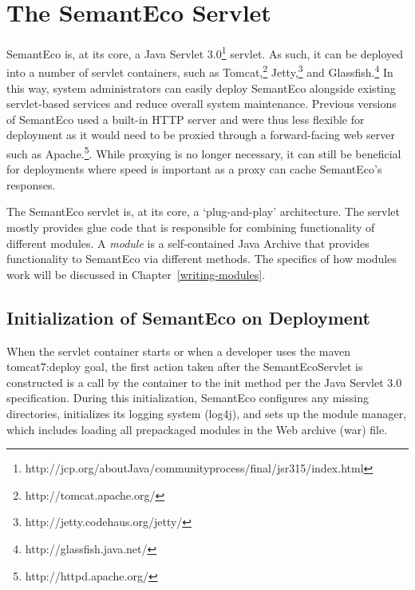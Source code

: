 \documentclass[letterpaper]{report}
\begin{document}
\section{The SemantEco Servlet}
\label{servlet}
SemantEco is, at its core, a Java Servlet 3.0\footnote{http://jcp.org/aboutJava/communityprocess/final/jsr315/index.html} servlet. As such, it can be deployed into a number of servlet containers, such as Tomcat,\footnote{http://tomcat.apache.org/} Jetty,\footnote{http://jetty.codehaus.org/jetty/} and Glassfish.\footnote{http://glassfish.java.net/} In this way, system administrators can easily deploy SemantEco alongside existing servlet-based services and reduce overall system maintenance. Previous versions of SemantEco used a built-in HTTP server and were thus less flexible for deployment as it would need to be proxied through a forward-facing web server such as Apache.\footnote{http://httpd.apache.org/}. While proxying is no longer necessary, it can still be beneficial for deployments where speed is important as a proxy can cache SemantEco's responses.

The SemantEco servlet is, at its core, a `plug-and-play' architecture. The servlet mostly provides glue code that is responsible for combining functionality of different modules. A \textit{module} is a self-contained Java Archive that provides functionality to SemantEco via different methods. The specifics of how modules work will be discussed in Chapter~\ref{writing-modules}.

\subsection{Initialization of SemantEco on Deployment} 
When the servlet container starts or when a developer uses the maven tomcat7:deploy goal, the first action taken after the SemantEcoServlet is constructed is a call by the container to the init method per the Java Servlet 3.0 specification. During this initialization, SemantEco configures any missing directories, initializes its logging system (log4j), and sets up the module manager, which includes loading all prepackaged modules in the Web archive (war) file.
\end{document}
